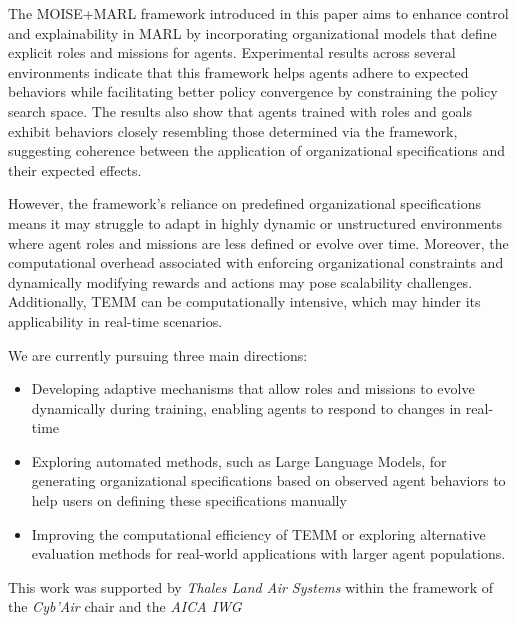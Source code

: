 \documentclass[sigconf]{aamas}
\begin{document}
The MOISE+MARL framework introduced in this paper aims to enhance control and explainability in MARL by incorporating organizational models that define explicit roles and missions for agents. Experimental results across several environments indicate that this framework helps agents adhere to expected behaviors while facilitating better policy convergence by constraining the policy search space. The results also show that agents trained with roles and goals exhibit behaviors closely resembling those determined via the framework, suggesting coherence between the application of organizational specifications and their expected effects.

However, the framework's reliance on predefined organizational specifications means it may struggle to adapt in highly dynamic or unstructured environments where agent roles and missions are less defined or evolve over time.
Moreover, the computational overhead associated with enforcing organizational constraints and dynamically modifying rewards and actions may pose scalability challenges. Additionally, TEMM can be computationally intensive, which may hinder its applicability in real-time scenarios.

We are currently pursuing three main directions:
%
\begin{itemize}
    \item Developing adaptive mechanisms that allow roles and missions to evolve dynamically during training, enabling agents to respond to changes in real-time
    \item Exploring automated methods, such as Large Language Models, for generating organizational specifications based on observed agent behaviors to help users on defining these specifications manually
    \item Improving the computational efficiency of TEMM or exploring alternative evaluation methods for real-world applications with larger agent populations.
\end{itemize}

\begin{acks}
  This work was supported by \emph{Thales Land Air Systems} within the framework of the \emph{Cyb'Air} chair and the \emph{AICA IWG}
\end{acks}




\balance


\end{document}
